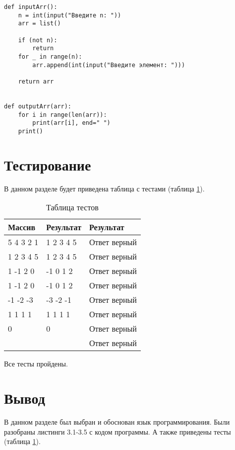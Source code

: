 \begin{lstlisting}[label=some-code,caption=Методы для работы с массивом]
def inputArr():
    n = int(input("Введите n: "))
    arr = list()

    if (not n):
        return
    for _ in range(n):
        arr.append(int(input("Введите элемент: ")))

    return arr


def outputArr(arr):
    for i in range(len(arr)):
        print(arr[i], end=" ")
    print()
\end{lstlisting}


\section{Тестирование}


В данном разделе будет приведена таблица с тестами (таблица \ref{table:ref1}).

\begin{table}[ht]
    \centering
    \caption{Таблица тестов}
    \label{table:ref1}
    \begin{tabular}{ | l | l | l |}
        \hline
        Массив    & Результат & Результат    \\ \hline
        5 4 3 2 1 & 1 2 3 4 5 & Ответ верный \\ \hline
        1 2 3 4 5 & 1 2 3 4 5 & Ответ верный \\ \hline
        1 -1 2 0  & -1 0 1 2  & Ответ верный \\ \hline
        1 -1 2 0  & -1 0 1 2  & Ответ верный \\ \hline
        -1 -2 -3  & -3 -2 -1  & Ответ верный \\ \hline
        1 1 1 1   & 1 1 1 1   & Ответ верный \\ \hline
        0         & 0         & Ответ верный \\ \hline
                  &           & Ответ верный \\ \hline
        \hline
    \end{tabular}
\end{table}

Все тесты пройдены.

\section{Вывод}

В данном разделе был выбран и обоснован язык программирования.
Были разобраны листинги 3.1-3.5 с кодом программы.
А также приведены тесты (таблица \ref{table:ref1}).